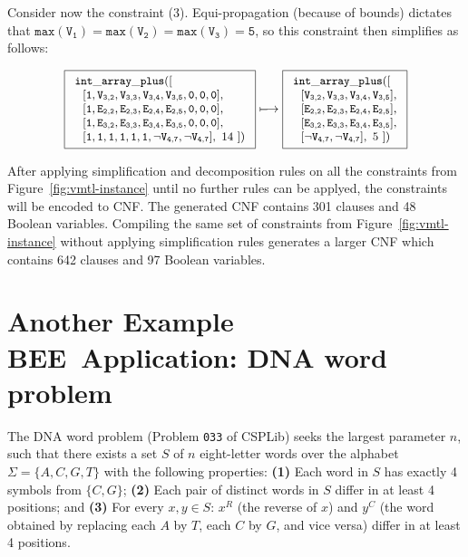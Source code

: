 \documentclass{tlp}
\newcommand{\bee}{\textsf{BEE}}
\begin{document}
Consider now the constraint (3). Equi-propagation (because of bounds)
dictates that $\mathtt{max(V_1)=max(V_2)=max(V_3)=5}$, so this
constraint then simplifies as follows:

\[\small
   \fbox{$\begin{array}{l}
    \mathtt{int\_array\_plus([}\\
    ~~\mathtt{[1,V_{3,2},V_{3,3},V_{3,4},V_{3,5},0,0,0]},\\
    ~~\mathtt{[1,E_{2,2},E_{2,3},E_{2,4},E_{2,5},0,0,0]},\\
    ~~\mathtt{[1,E_{3,2},E_{3,3},E_{3,4},E_{3,5},0,0,0]},\\
    ~~\mathtt{[1,1,1,1,1,1,\neg V_{4,7},\neg V_{4,7}]},~14~
   \mathtt{])}
  \end{array}$}
\longmapsto
   \fbox{$\begin{array}{l}
    \mathtt{int\_array\_plus([}\\
    ~~\mathtt{[V_{3,2},V_{3,3},V_{3,4},V_{3,5}]},\\
    ~~\mathtt{[E_{2,2},E_{2,3},E_{2,4},E_{2,5}]},\\
    ~~\mathtt{[E_{3,2},E_{3,3},E_{3,4},E_{3,5}]},\\
    ~~\mathtt{[\neg V_{4,7},\neg V_{4,7}]},~5~
    \mathtt{])}
  \end{array}$}
\]

\medskip After applying simplification and decomposition rules on all
the constraints from Figure~\ref{fig:vmtl-instance} until no further
rules can be applyed, the constraints will be encoded to CNF.  The
generated CNF contains 301 clauses and 48 Boolean variables.
Compiling the same set of constraints from
Figure~\ref{fig:vmtl-instance} without applying simplification rules
generates a larger CNF which contains 642 clauses and 97 Boolean
variables.











\section{Another Example \bee\ Application: 
DNA word problem}

The DNA word problem (Problem \texttt{033} of CSPLib) seeks the
largest parameter $n$, such that there exists a set $S$ of $n$
eight-letter words over the alphabet $\Sigma=\{A,C,G,T\}$ with the
following properties:
\textbf{(1)} Each word in $S$ has exactly 4 symbols from $\{C,G\}$;
\textbf{(2)} Each pair of distinct words in $S$ differ in at least 4 positions;
and
\textbf{(3)} For every $x,y\in S$: $x^R$ (the reverse of $x$) and $y^C$ (the
word obtained by replacing each $A$ by $T$, each $C$ by $G$, and vice
versa) differ in at least 4 positions.
\end{document}
